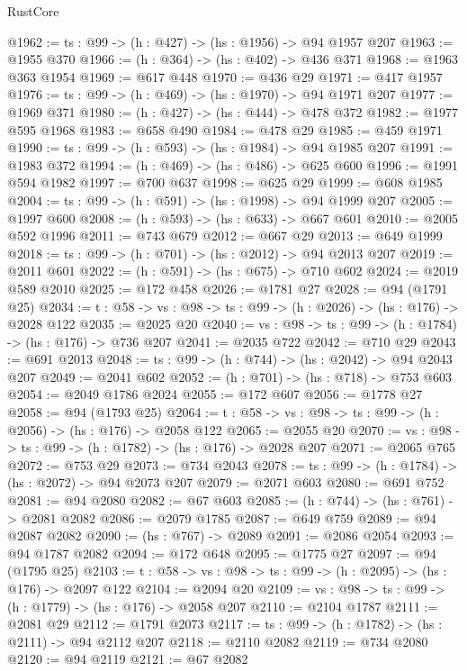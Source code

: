 \begin{lexlean}{RustCore}
\begin{coremodule}
@1962 := {ts : @99} -> (h : @427) -> (hs : @1956) -> @94 @1957 @207
@1963 := @1955 @370
@1966 := (h : @364) -> (hs : @402) -> @436 @371
@1968 := @1963 @363 @1954
@1969 := @617 @448
@1970 := @436 @29
@1971 := @417 @1957
@1976 := {ts : @99} -> (h : @469) -> (hs : @1970) -> @94 @1971 @207
@1977 := @1969 @371
@1980 := (h : @427) -> (hs : @444) -> @478 @372
@1982 := @1977 @595 @1968
@1983 := @658 @490
@1984 := @478 @29
@1985 := @459 @1971
@1990 := {ts : @99} -> (h : @593) -> (hs : @1984) -> @94 @1985 @207
@1991 := @1983 @372
@1994 := (h : @469) -> (hs : @486) -> @625 @600
@1996 := @1991 @594 @1982
@1997 := @700 @637
@1998 := @625 @29
@1999 := @608 @1985
@2004 := {ts : @99} -> (h : @591) -> (hs : @1998) -> @94 @1999 @207
@2005 := @1997 @600
@2008 := (h : @593) -> (hs : @633) -> @667 @601
@2010 := @2005 @592 @1996
@2011 := @743 @679
@2012 := @667 @29
@2013 := @649 @1999
@2018 := {ts : @99} -> (h : @701) -> (hs : @2012) -> @94 @2013 @207
@2019 := @2011 @601
@2022 := (h : @591) -> (hs : @675) -> @710 @602
@2024 := @2019 @589 @2010
@2025 := @172 @458
@2026 := @1781 @27
@2028 := @94 (@1791 @25)
@2034 := {t : @58} -> {vs : @98} -> {ts : @99} -> (h : @2026) -> (hs : @176) -> @2028 @122
@2035 := @2025 @20
@2040 := {vs : @98} -> {ts : @99} -> (h : @1784) -> (hs : @176) -> @736 @207
@2041 := @2035 @722
@2042 := @710 @29
@2043 := @691 @2013
@2048 := {ts : @99} -> (h : @744) -> (hs : @2042) -> @94 @2043 @207
@2049 := @2041 @602
@2052 := (h : @701) -> (hs : @718) -> @753 @603
@2054 := @2049 @1786 @2024
@2055 := @172 @607
@2056 := @1778 @27
@2058 := @94 (@1793 @25)
@2064 := {t : @58} -> {vs : @98} -> {ts : @99} -> (h : @2056) -> (hs : @176) -> @2058 @122
@2065 := @2055 @20
@2070 := {vs : @98} -> {ts : @99} -> (h : @1782) -> (hs : @176) -> @2028 @207
@2071 := @2065 @765
@2072 := @753 @29
@2073 := @734 @2043
@2078 := {ts : @99} -> (h : @1784) -> (hs : @2072) -> @94 @2073 @207
@2079 := @2071 @603
@2080 := @691 @752
@2081 := @94 @2080
@2082 := @67 @603
@2085 := (h : @744) -> (hs : @761) -> @2081 @2082
@2086 := @2079 @1785
@2087 := @649 @759
@2089 := @94 @2087 @2082
@2090 := (hs : @767) -> @2089
@2091 := @2086 @2054
@2093 := @94 @1787 @2082
@2094 := @172 @648
@2095 := @1775 @27
@2097 := @94 (@1795 @25)
@2103 := {t : @58} -> {vs : @98} -> {ts : @99} -> (h : @2095) -> (hs : @176) -> @2097 @122
@2104 := @2094 @20
@2109 := {vs : @98} -> {ts : @99} -> (h : @1779) -> (hs : @176) -> @2058 @207
@2110 := @2104 @1787
@2111 := @2081 @29
@2112 := @1791 @2073
@2117 := {ts : @99} -> (h : @1782) -> (hs : @2111) -> @94 @2112 @207
@2118 := @2110 @2082
@2119 := @734 @2080
@2120 := @94 @2119
@2121 := @67 @2082

\end{coremodule}
\end{lexlean}
